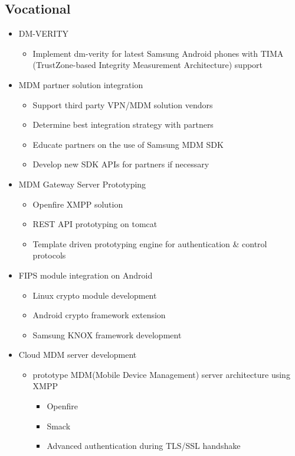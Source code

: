 \documentclass[11pt,a4paper,sans]{moderncv}        %
\begin{document}
\subsection{Vocational}
\begin{itemize}%
\item DM-VERITY
  \begin{itemize}%
  \item Implement dm-verity for latest Samsung Android phones with TIMA (TrustZone-based Integrity Measurement Architecture) support
  \end{itemize}
\item MDM partner solution integration
  \begin{itemize}%
  \item Support third party VPN/MDM solution vendors
  \item Determine best integration strategy with partners
  \item Educate partners on the use of Samsung MDM SDK
  \item Develop new SDK APIs for partners if necessary
  \end{itemize}
\item MDM Gateway Server Prototyping
  \begin{itemize}%
  \item Openfire XMPP solution
  \item REST API prototyping on tomcat
  \item Template driven prototyping engine for authentication \& control protocols
  \end{itemize}
\item FIPS module integration on Android
  \begin{itemize}%
  \item Linux crypto module development
  \item Android crypto framework extension
  \item Samsung KNOX framework development
  \end{itemize}
\item Cloud MDM server development
  \begin{itemize}%
  \item prototype MDM(Mobile Device Management) server architecture using XMPP
    \begin{itemize}%
    \item Openfire
    \item Smack
    \item Advanced authentication during TLS/SSL handshake
    \end{itemize}
  \end{itemize}
\end{itemize}
\end{document}
